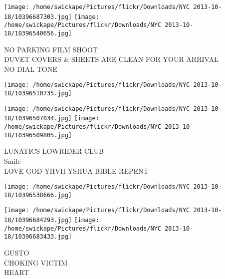 \documentclass[10pt,letterpaper]{article}
\begin{document}
\vspace{0.25in}
\texttt{[image: /home/swickape/Pictures/flickr/Downloads/NYC 2013-10-18/10396687303.jpg]}
\texttt{[image: /home/swickape/Pictures/flickr/Downloads/NYC 2013-10-18/10396540656.jpg]}

NO PARKING FILM SHOOT\\
DUVET COVERS \& SHEETS ARE CLEAN FOR YOUR ARRIVAL\\
NO DIAL TONE
\pagebreak

\texttt{[image: /home/swickape/Pictures/flickr/Downloads/NYC 2013-10-18/10396510735.jpg]}

\vspace{0.25in}
\texttt{[image: /home/swickape/Pictures/flickr/Downloads/NYC 2013-10-18/10396507034.jpg]}
\texttt{[image: /home/swickape/Pictures/flickr/Downloads/NYC 2013-10-18/10396509805.jpg]}

LUNATICS LOWRIDER CLUB\\
Smile\\
LOVE GOD YHVH YSHUA BIBLE REPENT
\pagebreak

\texttt{[image: /home/swickape/Pictures/flickr/Downloads/NYC 2013-10-18/10396538666.jpg]}

\vspace{0.25in}
\texttt{[image: /home/swickape/Pictures/flickr/Downloads/NYC 2013-10-18/10396684293.jpg]}
\texttt{[image: /home/swickape/Pictures/flickr/Downloads/NYC 2013-10-18/10396683433.jpg]}

GUSTO\\
CHOKING VICTIM\\
HEART
\pagebreak
\end{document}
